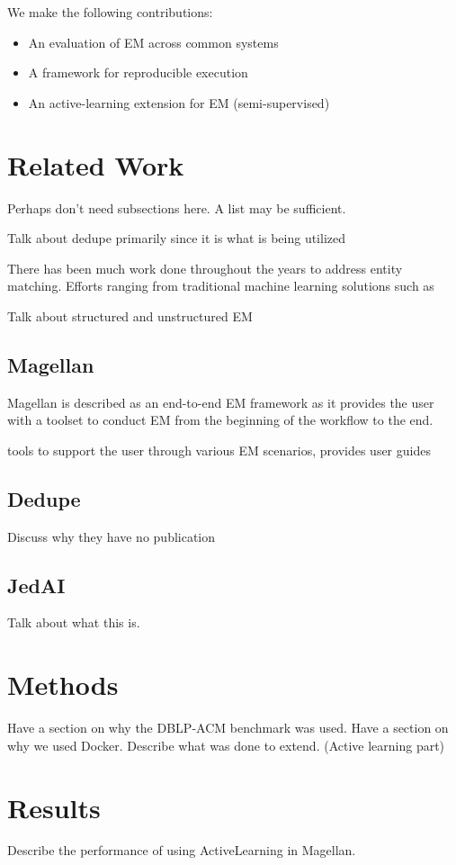 \documentclass[letterpaper,twocolumn,10pt]{article}
\begin{document}
We make the following contributions:
\begin{itemize}
  \item An evaluation of EM across common systems
  \item A framework for reproducible execution
  \item An active-learning extension for EM (semi-supervised)
\end{itemize}



\section{Related Work}
Perhaps don't need subsections here. A list may be sufficient.

Talk about dedupe primarily since it is what is being utilized

There has been much work done throughout the years to address entity matching. Efforts ranging from traditional machine learning solutions such as 

Talk about structured and unstructured EM


\subsection{Magellan}
Magellan is described as an end-to-end EM framework as it provides the user with a toolset to conduct EM from the beginning of the workflow to the end. 

tools to support the user through various EM scenarios, provides user guides 


\subsection{Dedupe}
Discuss why they have no publication


\subsection{JedAI}
Talk about what this is.


\section{Methods}
Have a section on why the DBLP-ACM benchmark was used.
Have a section on why we used Docker.
Describe what was done to extend. (Active learning part)


\section{Results}
Describe the performance of using ActiveLearning in Magellan.
\end{document}
